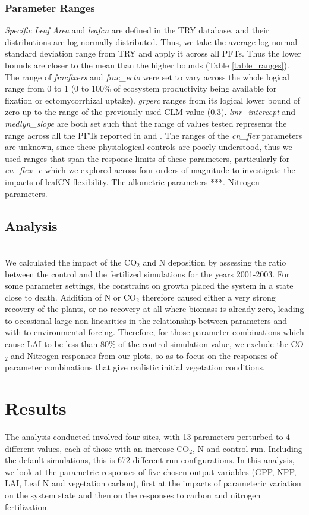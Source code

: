 \documentclass[draft,linenumbers]{agujournal}
\begin{document}
\subsubsection{Parameter Ranges}

\emph{Specific Leaf Area} and \emph{leafcn} are defined in the TRY database, and their distributions are log-normally distributed. Thus, we take the average log-normal standard deviation range from TRY and apply it across all PFTs. Thus the lower bounds are closer to the mean than the higher bounds (Table \ref{table_ranges}). The range of \emph{fracfixers} and \emph{frac\_ecto} were set to vary across the whole logical range from 0 to 1 (0 to 100\% of ecosystem productivity being available for fixation or ectomycorrhizal uptake). \emph{grperc} ranges from its logical lower bound of zero up to the range of the previously used CLM value (0.3). \emph{lmr\_intercept} and \emph{medlyn\_slope} are both set such that the range of values tested represents the range across all the PFTs reported in \cite{atkin2015} and \cite{dekauwe2015}. The ranges of the \emph{cn\_flex} parameters are unknown, since these physiological controls are poorly understood, thus we used ranges that span the response limits of these parameters, particularly for \emph{cn\_flex\_c} which we explored across four orders of magnitude to investigate the impacts of leafCN flexibility. The allometric parameters ***. Nitrogen parameters.


\subsection{Analysis}\\
We calculated the impact of the CO$_{2}$ and N deposition by assessing the ratio between the control and the fertilized simulations for the years 2001-2003. For some parameter settings, the constraint on growth placed the system in a state close to death. Addition of N or CO$_{2}$ therefore caused either a very strong recovery of the plants, or no recovery at all where biomass is already zero, leading to occasional large non-linearities in the relationship between parameters and  with  to environmental forcing. Therefore, for those parameter combinations which cause LAI to be less than 80\% of the control simulation value, we exclude the CO$_{2}$ and Nitrogen responses from our plots, so as to focus on the responses of parameter combinations that give realistic initial vegetation conditions.


\section{Results}
The analysis conducted involved four sites, with 13 parameters perturbed to 4 different values, each of those with an increase CO$_{2}$, N and control run. Including the default simulations, this is 672 different run configurations. In this analysis, we look at the parametric responses of five chosen output variables (GPP, NPP, LAI, Leaf N and vegetation carbon), first at the impacts of parameteric variation on the system state and then on the responses to carbon and nitrogen fertilization. 
\end{document}
